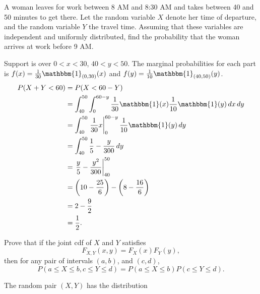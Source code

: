 \documentclass[12pt,letterpaper]{exam}
\begin{document}
\begin{questions}
\begin{solution}
\begin{parts}
		\end{parts}
	\end{solution}

	\setcounter{question}{6}
	\question 
	A woman leaves for work between 8 AM and 8:30 AM and takes between 40 and 50 
	minutes to get there. Let the random variable \(X\) denote her time of departure, and
	the random variable \(Y\) the travel time. Assuming that these variables are independent
	and uniformly distributed, find the probability that the woman arrives at work before
	9 AM.
	
	\begin{solution}
		Support is over \(0<x<30\), \(40<y<50\). The marginal probabilities for each part is		
		\(f(x) = \frac{1}{30} \mathbbm{1}_{(0,30)}(x)\) 
		and
		\(f(y) = \frac{1}{10} \mathbbm{1}_{(40,50)}(y)\).
		\begin{align*}
			P(X+Y<60)
			&= P(X<60-Y) \\
			&= \int_{40}^{50} \int_{0}^{60-y} \frac{1}{30} \mathbbm{1}(x) \frac{1}{10} \mathbbm{1}(y) \,dx \,dy \\
			&= \int_{40}^{50} \left. \frac{1}{30}x \right|_{0}^{60-y} \frac{1}{10} \mathbbm{1}(y) \,dy \\
			&= \int_{40}^{50} \frac{1}{5} - \frac{y}{300} \,dy \\
			&= \left. \frac{y}{5} - \frac{y^2}{300} \right|_{40}^{50} \\
			&= \left(10 - \frac{25}{6}\right) - \left(8 - \frac{16}{6}\right) \\
			&= 2 - \frac{9}{2} \\
			&= \frac{1}{2} .
		\end{align*}
		
	\end{solution}
	\clearpage
	
	\setcounter{question}{8}
	\question 
	Prove that if the joint cdf of \(X\) and \(Y\) satisfies
		\[F_{X,Y} (x,y) = F_X(x)F_Y(y),\]
	then for any pair of intervals \((a, b)\), and \((c, d)\),
		\[P(a \leq X \leq b, c \leq Y \leq d) = P(a \leq X \leq b)P(c \leq Y \leq d).\]
	
	\begin{solution}
		
	\end{solution}

	\question 
	The random pair \((X,Y)\) has the distribution
	

\end{questions}
\end{document}
